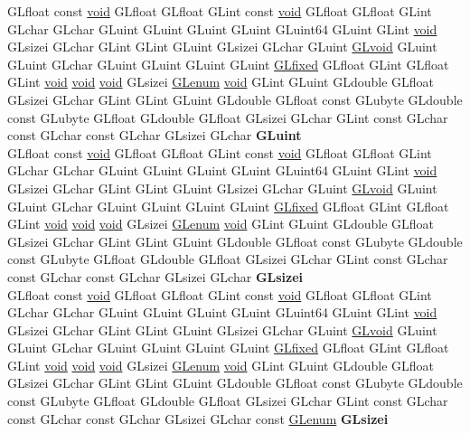\begin{DoxyCompactItemize}
\begin{tabbing}
\>GLfloat const \hyperlink{interfacevoid}{void} GLfloat GLfloat GLint const \hyperlink{interfacevoid}{void} GLfloat GLfloat GLint GLchar GLchar GLuint GLuint GLuint GLuint GLuint64 GLuint GLint \hyperlink{interfacevoid}{void} GLsizei GLchar GLint GLint GLuint GLsizei GLchar GLuint \hyperlink{interfacevoid}{GLvoid} GLuint GLuint GLchar GLuint GLuint GLuint GLuint \hyperlink{glheader_8h_ad6d3fa892df40dedf48ee6d84529ae5e}{GLfixed} GLfloat GLint GLfloat GLint \hyperlink{interfacevoid}{void} \hyperlink{interfacevoid}{void} \hyperlink{interfacevoid}{void} GLsizei \hyperlink{interfacevoid}{GLenum} \hyperlink{interfacevoid}{void} GLint GLuint GLdouble GLfloat GLsizei GLchar GLint GLint GLuint GLdouble GLfloat const GLubyte GLdouble const GLubyte GLfloat GLdouble GLfloat GLsizei GLchar GLint const GLchar const GLchar const GLchar GLsizei GLchar {\bfseries GLuint}\\
\>GLfloat const \hyperlink{interfacevoid}{void} GLfloat GLfloat GLint const \hyperlink{interfacevoid}{void} GLfloat GLfloat GLint GLchar GLchar GLuint GLuint GLuint GLuint GLuint64 GLuint GLint \hyperlink{interfacevoid}{void} GLsizei GLchar GLint GLint GLuint GLsizei GLchar GLuint \hyperlink{interfacevoid}{GLvoid} GLuint GLuint GLchar GLuint GLuint GLuint GLuint \hyperlink{glheader_8h_ad6d3fa892df40dedf48ee6d84529ae5e}{GLfixed} GLfloat GLint GLfloat GLint \hyperlink{interfacevoid}{void} \hyperlink{interfacevoid}{void} \hyperlink{interfacevoid}{void} GLsizei \hyperlink{interfacevoid}{GLenum} \hyperlink{interfacevoid}{void} GLint GLuint GLdouble GLfloat GLsizei GLchar GLint GLint GLuint GLdouble GLfloat const GLubyte GLdouble const GLubyte GLfloat GLdouble GLfloat GLsizei GLchar GLint const GLchar const GLchar const GLchar GLsizei GLchar {\bfseries GLsizei}\\
\>GLfloat const \hyperlink{interfacevoid}{void} GLfloat GLfloat GLint const \hyperlink{interfacevoid}{void} GLfloat GLfloat GLint GLchar GLchar GLuint GLuint GLuint GLuint GLuint64 GLuint GLint \hyperlink{interfacevoid}{void} GLsizei GLchar GLint GLint GLuint GLsizei GLchar GLuint \hyperlink{interfacevoid}{GLvoid} GLuint GLuint GLchar GLuint GLuint GLuint GLuint \hyperlink{glheader_8h_ad6d3fa892df40dedf48ee6d84529ae5e}{GLfixed} GLfloat GLint GLfloat GLint \hyperlink{interfacevoid}{void} \hyperlink{interfacevoid}{void} \hyperlink{interfacevoid}{void} GLsizei \hyperlink{interfacevoid}{GLenum} \hyperlink{interfacevoid}{void} GLint GLuint GLdouble GLfloat GLsizei GLchar GLint GLint GLuint GLdouble GLfloat const GLubyte GLdouble const GLubyte GLfloat GLdouble GLfloat GLsizei GLchar GLint const GLchar const GLchar const GLchar GLsizei GLchar const \hyperlink{interfacevoid}{GLenum} {\bfseries GLsizei}\\

\end{tabbing}
\end{DoxyCompactItemize}
